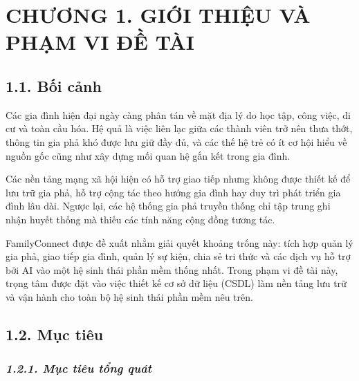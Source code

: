 \hypertarget{chux1b0ux1a1ng-1.-giux1edbi-thiux1ec7u-vuxe0-phux1ea1m-vi-ux111ux1ec1-tuxe0i}{%
\section{\texorpdfstring{\textbf{CHƯƠNG 1. GIỚI THIỆU VÀ PHẠM VI ĐỀ TÀI}}{CHƯƠNG 1. GIỚI THIỆU VÀ PHẠM VI ĐỀ TÀI}}\label{chux1b0ux1a1ng-1.-giux1edbi-thiux1ec7u-vuxe0-phux1ea1m-vi-ux111ux1ec1-tuxe0i}}

\hypertarget{bux1ed1i-cux1ea3nh}{%
\subsection{\texorpdfstring{\textbf{1.1. Bối cảnh}}{1.1. Bối cảnh}}\label{bux1ed1i-cux1ea3nh}}

Các gia đình hiện đại ngày càng phân tán về mặt địa lý do học tập, công việc, di cư và toàn cầu hóa. Hệ quả là việc liên lạc giữa các thành viên trở nên thưa thớt, thông tin gia phả khó được lưu giữ đầy đủ, và các thế hệ trẻ có ít cơ hội hiểu về nguồn gốc cũng như xây dựng mối quan hệ gắn kết trong gia đình.

Các nền tảng mạng xã hội hiện có hỗ trợ giao tiếp nhưng không được thiết kế để lưu trữ gia phả, hỗ trợ cộng tác theo hướng gia đình hay duy trì phát triển gia đình lâu dài. Ngược lại, các hệ thống gia phả truyền thống chỉ tập trung ghi nhận huyết thống mà thiếu các tính năng cộng đồng tương tác.

FamilyConnect được đề xuất nhằm giải quyết khoảng trống này: tích hợp quản lý gia phả, giao tiếp gia đình, quản lý sự kiện, chia sẻ tri thức và các dịch vụ hỗ trợ bởi AI vào một hệ sinh thái phần mềm thống nhất. Trong phạm vi đề tài này, trọng tâm được đặt vào việc thiết kế cơ sở dữ liệu (CSDL) làm nền tảng lưu trữ và vận hành cho toàn bộ hệ sinh thái phần mềm nêu trên.

\hypertarget{mux1ee5c-tiuxeau}{%
\subsection{\texorpdfstring{\textbf{1.2. Mục tiêu}}{1.2. Mục tiêu}}\label{mux1ee5c-tiuxeau}}

\hypertarget{mux1ee5c-tiuxeau-tux1ed5ng-quuxe1t}{%
\subsubsection{\texorpdfstring{\emph{\textbf{1.2.1. Mục tiêu tổng quát}}}{1.2.1. Mục tiêu tổng quát}}\label{mux1ee5c-tiuxeau-tux1ed5ng-quuxe1t}}

